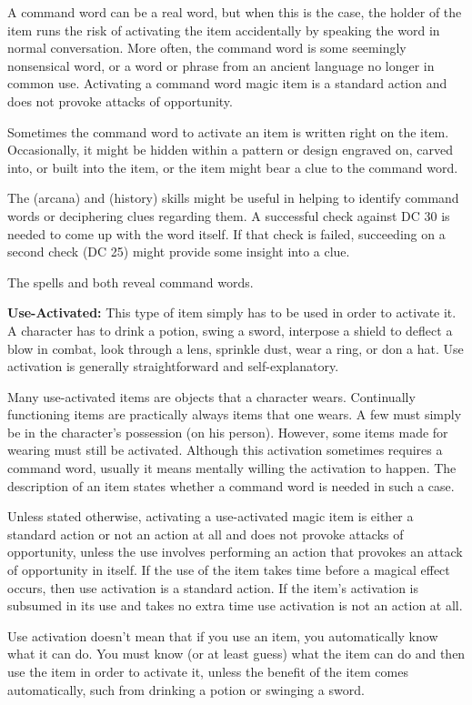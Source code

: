 A command word can be a real word, but when this is the case, the holder of the item runs the risk of activating the item accidentally by speaking the word in normal conversation. More often, the command word is some seemingly nonsensical word, or a word or phrase from an ancient language no longer in common use. Activating a command word magic item is a standard action and does not provoke attacks of opportunity. 

Sometimes the command word to activate an item is written right on the item. Occasionally, it might be hidden within a pattern or design engraved on, carved into, or built into the item, or the item might bear a clue to the command word.

The  (arcana) and  (history) skills might be useful in helping to identify command words or deciphering clues regarding them. A successful check against DC 30 is needed to come up with the word itself. If that check is failed, succeeding on a second check (DC 25) might provide some insight into a clue.

The spells  and  both reveal command words.

\textbf{Use-Activated:} This type of item simply has to be used in order to activate it. A character has to drink a potion, swing a sword, interpose a shield to deflect a blow in combat, look through a lens, sprinkle dust, wear a ring, or don a hat. Use activation is generally straightforward and self-explanatory.

Many use-activated items are objects that a character wears. Continually functioning items are practically always items that one wears. A few must simply be in the character's possession (on his person). However, some items made for wearing must still be activated. Although this activation sometimes requires a command word, usually it means mentally willing the activation to happen. The description of an item states whether a command word is needed in such a case.

Unless stated otherwise, activating a use-activated magic item is either a standard action or not an action at all and does not provoke attacks of opportunity, unless the use involves performing an action that provokes an attack of opportunity in itself. If the use of the item takes time before a magical effect occurs, then use activation is a standard action. If the item's activation is subsumed in its use and takes no extra time use activation is not an action at all.

Use activation doesn't mean that if you use an item, you automatically know what it can do. You must know (or at least guess) what the item can do and then use the item in order to activate it, unless the benefit of the item comes automatically, such from drinking a potion or swinging a sword.